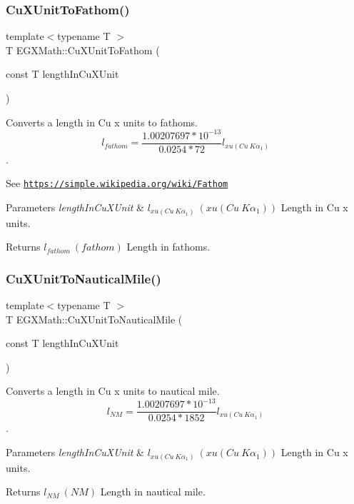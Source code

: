 \subsubsection{\texorpdfstring{Cu\+X\+Unit\+To\+Fathom()}{CuXUnitToFathom()}}
{\footnotesize\ttfamily template$<$typename T $>$ \\
T E\+G\+X\+Math\+::\+Cu\+X\+Unit\+To\+Fathom (\begin{DoxyParamCaption}\item[{const T}]{length\+In\+Cu\+X\+Unit }\end{DoxyParamCaption})}



Converts a length in Cu x units to fathoms. \[ l_{fathom}= \frac{1.00207697*10^{-13}}{0.0254 * 72} l_{xu(Cu\ K\alpha_1)} \]. 

See \href{https://simple.wikipedia.org/wiki/Fathom}{\tt https\+://simple.\+wikipedia.\+org/wiki/\+Fathom} 
\begin{DoxyParams}{Parameters}
{\em length\+In\+Cu\+X\+Unit} & $ l_{xu(Cu\ K\alpha_1)}\ (xu(Cu\ K\alpha_1))$ Length in Cu x units. \\
\hline
\end{DoxyParams}
\begin{DoxyReturn}{Returns}
$ l_{fathom}\ (fathom)$ Length in fathoms. 
\end{DoxyReturn}
\mbox{\label{group___e_g_x_math-_conversions-_length_conversions-_non-_s_i-_cu_x_unit-_nautical_gaaa51a984890efeec739a702b982fad57}} 
\subsubsection{\texorpdfstring{Cu\+X\+Unit\+To\+Nautical\+Mile()}{CuXUnitToNauticalMile()}}
{\footnotesize\ttfamily template$<$typename T $>$ \\
T E\+G\+X\+Math\+::\+Cu\+X\+Unit\+To\+Nautical\+Mile (\begin{DoxyParamCaption}\item[{const T}]{length\+In\+Cu\+X\+Unit }\end{DoxyParamCaption})}



Converts a length in Cu x units to nautical mile. \[ l_{NM}= \frac{1.00207697*10^{-13}}{0.0254 * 1852} l_{xu(Cu\ K\alpha_1)} \]. 


\begin{DoxyParams}{Parameters}
{\em length\+In\+Cu\+X\+Unit} & $ l_{xu(Cu\ K\alpha_1)}\ (xu(Cu\ K\alpha_1))$ Length in Cu x units. \\
\hline
\end{DoxyParams}
\begin{DoxyReturn}{Returns}
$ l_{NM}\ (NM)$ Length in nautical mile. 
\end{DoxyReturn}
